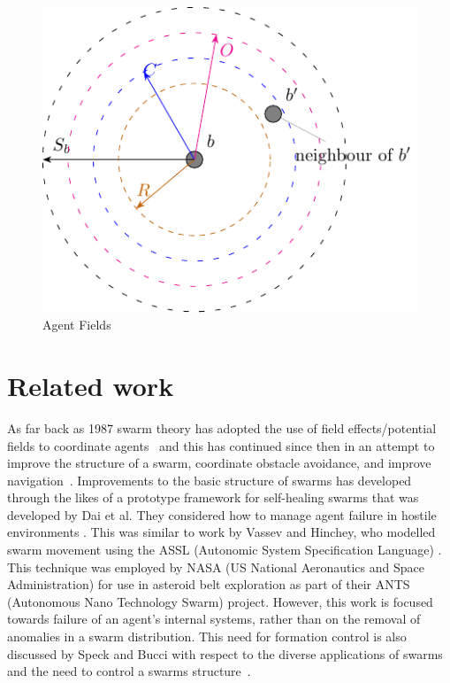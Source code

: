 \documentclass[12pt,a4paper]{IEEEtran}
\begin{document}
\begin{figure}[H]
	\centering
	\includegraphics[width=0.8\linewidth]{figures/stableswarm}
	\caption[Agent Fields]{Agent Fields}
	\label{fig:stableswarm}
\end{figure}

\section{Related work}

As far back as 1987 swarm theory has adopted the use of field effects/potential fields to coordinate agents~\cite{REY:87} and this has continued since then in an attempt to improve the structure of a swarm, coordinate obstacle avoidance, and improve navigation~\cite{BAFVM:06,BAF:06,BFV:07,BM:09,eliot2018metric,VG:05,HC:09,SW:03,Son2017}. Improvements to the basic structure of swarms has developed through the likes of a prototype framework for self-healing swarms that was developed by Dai et al. They considered how to manage agent failure in hostile environments \cite{DHMRZ:06}. This was similar to work by Vassev and Hinchey, who modelled swarm movement using the ASSL (Autonomic System Specification Language) \cite{VH:09}. This technique was employed by NASA (US National Aeronautics and Space Administration) for use in asteroid belt exploration as part of their ANTS (Autonomous Nano Technology Swarm) project. However, this work is focused towards failure of an agent's internal systems, rather than on the removal of anomalies in a swarm distribution. This need for formation control is also discussed by Speck and Bucci with respect to the diverse applications of swarms and the need to control a swarms structure~\cite{8430773}.
\end{document}
